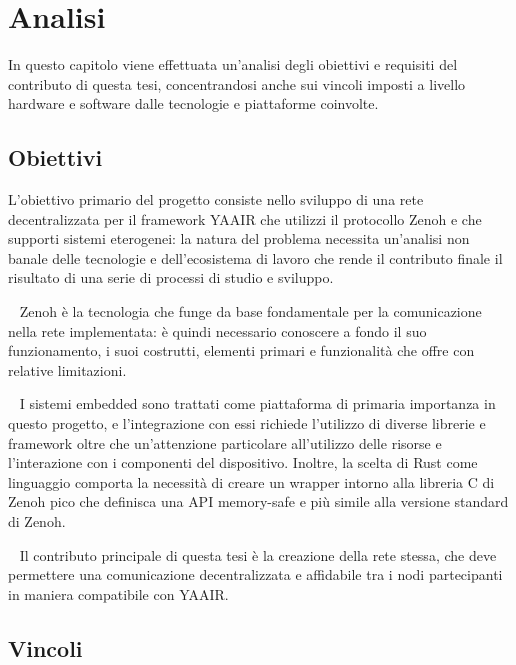 \chapter{Analisi}
\label{chap:analysis}

In questo capitolo viene effettuata un'analisi degli obiettivi e requisiti del
contributo di questa tesi, concentrandosi anche sui vincoli imposti a livello
hardware e software dalle tecnologie e piattaforme coinvolte.

\section{Obiettivi}
\label{sec:objectives}

L'obiettivo primario del progetto consiste nello sviluppo di una rete decentralizzata
per il framework \ac{YAAIR} che utilizzi il protocollo Zenoh e che supporti sistemi
eterogenei: la natura del problema necessita un'analisi non banale delle tecnologie
e dell'ecosistema di lavoro che rende il contributo finale il risultato di una serie
di processi di studio e sviluppo.

\begin{objectives}
	~\label{objective:zenoh-study}
	Zenoh è la tecnologia che funge da base fondamentale per la comunicazione nella
	rete implementata: è quindi necessario conoscere a fondo il suo funzionamento,
	i suoi costrutti, elementi primari e funzionalità che offre con relative limitazioni.

	~\label{objective:embedded-ecosystem-integration}
	I sistemi embedded sono trattati come piattaforma di primaria importanza in
	questo progetto, e l'integrazione con essi richiede l'utilizzo di diverse librerie
	e framework oltre che un'attenzione particolare all'utilizzo delle risorse e
	l'interazione con i componenti del dispositivo.
	Inoltre, la scelta di Rust come linguaggio comporta la necessità di creare un
	wrapper intorno alla libreria C di Zenoh pico che definisca una \ac{API} memory-safe
	e più simile alla versione standard di Zenoh.

	~\label{objective:network-implementation}
	Il contributo principale di questa tesi è la creazione della rete stessa, che
	deve permettere una comunicazione decentralizzata e affidabile tra i nodi
	partecipanti in maniera compatibile con \ac{YAAIR}.
\end{objectives}

\section{Vincoli}
\label{sec:constraints}

